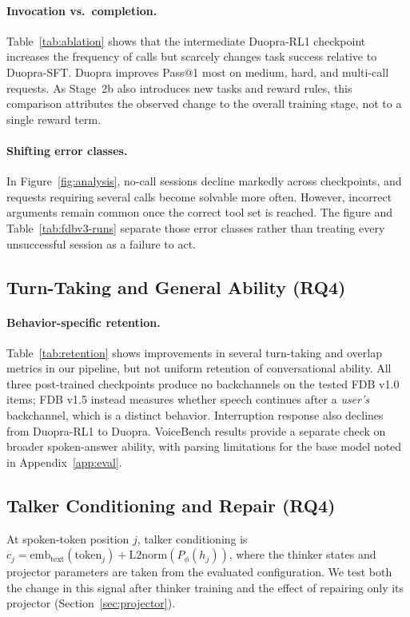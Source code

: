 \paragraph{Invocation vs.\ completion.}
Table~\ref{tab:ablation} shows that the intermediate Duopra-RL1 checkpoint increases the frequency of calls but scarcely changes task success relative to Duopra-SFT. Duopra improves Pass@1 most on medium, hard, and multi-call requests. As Stage~2b also introduces new tasks and reward rules, this comparison attributes the observed change to the overall training stage, not to a single reward term.


\paragraph{Shifting error classes.}
In Figure~\ref{fig:analysis}, no-call sessions decline markedly across checkpoints, and requests requiring several calls become solvable more often. However, incorrect arguments remain common once the correct tool set is reached. The figure and Table~\ref{tab:fdbv3-runs} separate those error classes rather than treating every unsuccessful session as a failure to act.

\subsection{Turn-Taking and General Ability (RQ4)}


\paragraph{Behavior-specific retention.}
Table~\ref{tab:retention} shows improvements in several turn-taking and overlap metrics in our pipeline, but not uniform retention of conversational ability. All three post-trained checkpoints produce no backchannels on the tested FDB v1.0 items; FDB v1.5 instead measures whether speech continues after a \emph{user's} backchannel, which is a distinct behavior. Interruption response also declines from Duopra-RL1 to Duopra. VoiceBench results provide a separate check on broader spoken-answer ability, with parsing limitations for the base model noted in Appendix~\ref{app:eval}.

\subsection{Talker Conditioning and Repair (RQ4)}
\label{app:projector}
At spoken-token position $j$, talker conditioning is
$c_j=\mathrm{emb}_{\mathrm{text}}(\mathrm{token}_j)+\mathrm{L2norm}(P_\phi(h_j))$,
where the thinker states and projector parameters are taken from the evaluated configuration. We test both the change in this signal after thinker training and the effect of repairing only its projector (Section~\ref{sec:projector}).

